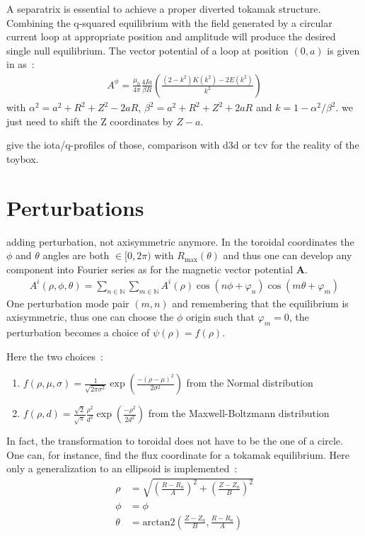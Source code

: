 A separatrix is essential to achieve a proper diverted tokamak structure. Combining the q-squared equilibrium with the field generated by a circular current loop at appropriate position and amplitude will produce the desired single null equilibrium. The vector potential of a loop at position $(0, a)$ is given in \cite{simpson_simple_2001} as~:
\begin{align*}
    A^\phi = \frac{\mu_0}{4\pi}\frac{4Ia}{\beta R}\left(\frac{(2-k^2)K(k^2)-2E(k^2)}{k^2}\right)
\end{align*}
with $\alpha^2 = a^2 + R^2 + Z^2 - 2aR$, $\beta^2 = a^2+R^2+Z^2+2aR$ and $k = 1 - \alpha^2/\beta^2$. we just need to shift the Z coordinates by $Z-a$.

give the iota/q-profiles of those, comparison with d3d or tcv for the reality of the toybox.

\section{Perturbations}
adding perturbation, not axisymmetric anymore. In the toroidal coordinates the $\phi$ and $\theta$ angles are both $\in [0, 2\pi)$ with $R_\text{max}(\theta)$ and thus one can develop any component into Fourier series as for the magnetic vector potential $\textbf{A}$.
\begin{align*}
    A^i(\rho,\phi,\theta) = \sum\limits_{n\in\mathbb{N}}\sum\limits_{m\in\mathbb{N}} A^i(\rho)\cos(n\phi + \varphi_n)\cos(m\theta + \varphi_m)
\end{align*}
One perturbation mode pair $(m,n)$ and remembering that the equilibrium is axisymmetric, thus one can choose the $\phi$ origin such that $\varphi_m = 0$, the perturbation becomes a choice of $\psi(\rho) = f(\rho)$.

Here the two choices~:

\begin{enumerate}
    \item $f(\rho, \mu, \sigma) = \frac{1}{\sqrt{2\pi\sigma^2}}\exp\left(\frac{-(\rho-\mu)^2}{2\sigma^2}\right)$ from the Normal distribution
    
    \item $f(\rho, d) = \frac{\sqrt{2}}{\sqrt{\pi}}\frac{\rho^2}{d^3}\exp\left(\frac{-\rho^2}{2d^2}\right)$ from the Maxwell-Boltzmann distribution
\end{enumerate}

In fact, the transformation to toroidal does not have to be the one of a circle. One can, for instance, find the flux coordinate for a tokamak equilibrium. Here only a generalization to an ellipsoid is implemented~:
\begin{align*}
    \rho &= \sqrt{\left(\frac{R-R_a}{A}\right)^2 + \left(\frac{Z-Z_a}{B}\right)^2}\\
    \phi &= \phi\\
    \theta &= \text{arctan2}(\frac{Z-Z_a}{B}, \frac{R-R_a}{A})\\
\end{align*}

